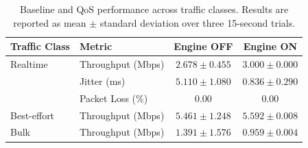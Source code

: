 \begin{table}[t]
\centering
\caption{Baseline and QoS performance across traffic classes. Results are reported as mean $\pm$ standard deviation over three 15-second trials.}
\label{tab:table1}
\begin{tabular}{llcc}
\hline
\textbf{Traffic Class} & \textbf{Metric} & \textbf{Engine OFF} & \textbf{Engine ON} \\
\hline
Realtime & Throughput (Mbps) & $2.678 \pm 0.455$ & $3.000 \pm 0.000$ \\
         & Jitter (ms)       & $5.110 \pm 1.080$ & $0.836 \pm 0.290$ \\
         & Packet Loss (\%)  & $0.00$            & $0.00$ \\
\hline
Best-effort & Throughput (Mbps) & $5.461 \pm 1.248$ & $5.592 \pm 0.008$ \\
\hline
Bulk & Throughput (Mbps) & $1.391 \pm 1.576$ & $0.959 \pm 0.004$ \\
\hline
\end{tabular}
\end{table}
